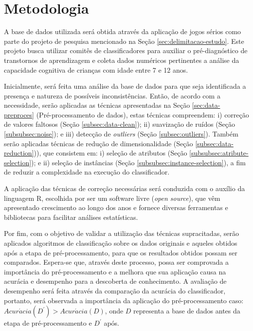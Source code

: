 \section{Metodologia}
\label{sec:metodologia-proposta}

A base de dados utilizada será obtida através da aplicação de jogos sérios como parte do projeto de pesquisa mencionado na Seção \ref{sec:delimitacao-estudo}. Este projeto busca utilizar comitês de classificadores para auxiliar o pré\hyp{}diagnóstico de transtornos de aprendizagem e coleta dados numéricos pertinentes a análise da capacidade cognitiva de crianças com idade entre 7 e 12 anos.

Inicialmente, será feita uma análise da base de dados para que seja identificada a presença e natureza de possíveis inconsistências. Então, de acordo com a necessidade, serão aplicadas as técnicas apresentadas na Seção \ref{sec:data-preproces} (Pré\hyp{}processamento de dados), estas técnicas compreendem: i) correção de valores faltosos (Seção \ref{subsec:data-clean}); ii) suavização de ruídos (Seção \ref{subsubsec:noise}); e iii) detecção de \textit{outliers} (Seção \ref{subsec:outliers}). Também serão aplicadas técnicas de redução de dimensionalidade (Seção \ref{subsec:data-reduction})), que consistem em: i) seleção de atributos (Seção \ref{subsubsec:atribute-selection}); e ii) seleção de instâncias (Seção \ref{subsubsec:instance-selection}), a fim de reduzir a complexidade na execução do classificador.

A aplicação das técnicas de correção necessárias será conduzida com o auxílio da linguagem R, escolhida por ser um software livre (\textit{open source}), que vêm apresentado crescimento ao longo dos anos e fornece diversas ferramentas e bibliotecas para facilitar análises estatísticas.

Por fim, com o objetivo de validar a utilização das técnicas supracitadas, serão aplicados algoritmos de classificação sobre os dados originais e aqueles obtidos após a etapa de pré\hyp{}processamento, para que os resultados obtidos possam ser comparados. Espera\hyp{}se que, através deste processo, possa ser comprovada a importância do pré\hyp{}processamento e a melhora que sua aplicação causa na acurácia e desempenho para a descoberta de conhecimento. A avaliação de desempenho será feita através da comparação da acurácia do classificador, portanto, será observada a importância da aplicação do pré\hyp{}processamento caso: $Acur\acute{a}cia \left ( D^{'} \right ) > Acur\acute{a}cia \left ( D \right )$, onde $D$ representa a base de dados antes da etapa de pré\hyp{}processamento e $D^{'}$ após.